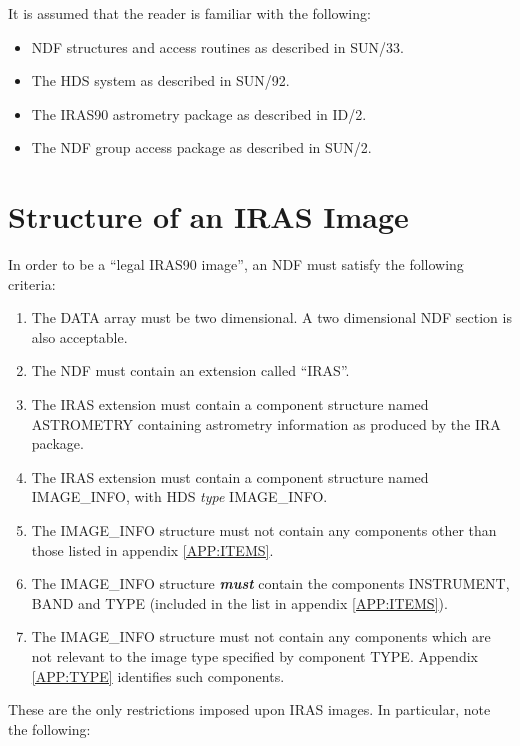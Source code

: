 It is assumed that the reader is familiar with the following:
\begin{itemize}
\item NDF structures and access routines as described in SUN/33.
\item The HDS system as described in SUN/92.
\item The IRAS90 astrometry package as described in ID/2.
\item The NDF group access package as described in SUN/2.
\end{itemize}

\section{Structure of an IRAS Image}
In order to be a ``legal IRAS90 image'', an NDF must satisfy the following 
criteria:

\begin{enumerate}

\item The DATA array must be two dimensional. A two dimensional NDF section is 
also acceptable.

\item The NDF must contain an extension called ``IRAS''.

\item The IRAS extension must contain a component structure named ASTROMETRY 
containing astrometry information as produced by the IRA package. 

\item The IRAS extension must contain a component structure named IMAGE\_INFO, 
with HDS {\em type} IMAGE\_INFO.

\item The IMAGE\_INFO structure must not contain any components other than those
listed in appendix \ref{APP:ITEMS}.

\item The IMAGE\_INFO structure {\bf {\em must} } contain the components 
INSTRUMENT, BAND and TYPE (included in the list in appendix \ref{APP:ITEMS}).

\item The IMAGE\_INFO structure must not contain any components which are not
relevant to the image type specified by component TYPE. Appendix \ref{APP:TYPE}
identifies such components. 
\end{enumerate}

These are the only restrictions imposed upon IRAS images. In particular, 
note the following:

